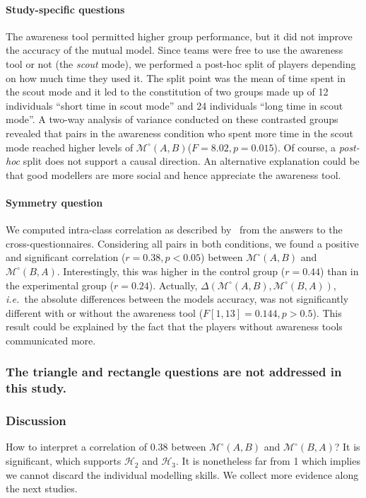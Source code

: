 \documentclass[natbib]{svjour3}
\newcommand{\ie}{{\textit{i.e.\ }}}
\newcommand{\gModel}[2]{{$\mathcal{M}^{\circ}(#1, #2)$}}
\newcommand{\gMdeg}[2]{{\mathcal{M}^{\circ}(#1, #2)}}
\begin{document}
\paragraph{Study-specific questions} The awareness tool permitted higher group
performance, but it did not improve the accuracy of the mutual model. Since
teams were free to use the awareness tool or not (the \emph{scout} mode), we
performed a post-hoc split of players depending on how much time they used it.
The split point was the mean of time spent in the scout mode and it led to the
constitution of two groups made up of 12 individuals ``short time in scout
mode'' and 24 individuals ``long time in scout mode''. A two-way analysis of
variance conducted on these contrasted groups revealed that pairs in the
awareness condition who spent more time in the scout mode reached higher levels
of \gModel{A}{B}($F = 8.02, p = 0.015$). Of course, a \textit{post-hoc} split
does not support a causal direction. An alternative explanation could be that
good modellers are more social and hence appreciate the awareness tool.

\paragraph{Symmetry question} We computed intra-class correlation as described
by~\citet{kenny1998data} from the answers to the cross-questionnaires.
Considering all pairs in both conditions, we found a positive and significant
correlation ($r = 0.38, p < 0.05$) between \gModel{A}{B} and \gModel{B}{A}.
Interestingly, this was higher in the control group ($r = 0.44$) than in the
experimental group ($r = 0.24$). Actually, $\Delta(\gMdeg{A}{B},\gMdeg{B}{A})$,
\ie the absolute differences between the models accuracy, was not significantly
different with or without the awareness tool ($F [1,13]= 0.144, p > 0.5$). This
result could be explained by the fact that the players without awareness tools
communicated more.

\subsubsection*{The triangle and rectangle questions are not addressed in this study.}

\subsubsection*{Discussion}

How to interpret a correlation of 0.38 between \gModel{A}{B} and \gModel{B}{A}? It is significant, which supports $\mathcal{H}_{2}$ and $\mathcal{H}_{3}$. It is nonetheless far from 1 which implies we cannot discard the individual modelling skills. We collect more evidence along the next studies.
\end{document}
